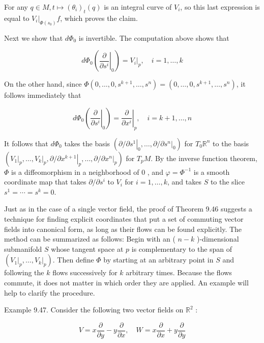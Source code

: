 \documentclass[10pt]{article}
\begin{document}
For any $q \in M, t \mapsto\left(\theta_{i}\right)_{t}(q)$ is an integral curve of $V_{i}$, so this last expression is equal to $\left.V_{i}\right|_{\Phi\left(s_{0}\right)} f$, which proves the claim.

Next we show that $d \Phi_{0}$ is invertible. The computation above shows that

$$
d \Phi_{0}\left(\left.\frac{\partial}{\partial s^{i}}\right|_{0}\right)=\left.V_{i}\right|_{p}, \quad i=1, \ldots, k
$$

On the other hand, since $\Phi\left(0, \ldots, 0, s^{k+1}, \ldots, s^{n}\right)=\left(0, \ldots, 0, s^{k+1}, \ldots, s^{n}\right)$, it follows immediately that

$$
d \Phi_{0}\left(\left.\frac{\partial}{\partial s^{i}}\right|_{0}\right)=\left.\frac{\partial}{\partial x^{i}}\right|_{p}, \quad i=k+1, \ldots, n
$$

It follows that $d \Phi_{0}$ takes the basis $\left(\partial /\left.\partial s^{1}\right|_{0}, \ldots, \partial /\left.\partial s^{n}\right|_{0}\right)$ for $T_{0} \mathbb{R}^{n}$ to the basis $\left(\left.V_{1}\right|_{p}, \ldots,\left.V_{k}\right|_{p}, \partial /\left.\partial x^{k+1}\right|_{p}, \ldots, \partial /\left.\partial x^{n}\right|_{p}\right)$ for $T_{p} M$. By the inverse function theorem, $\Phi$ is a diffeomorphism in a neighborhood of 0 , and $\varphi=\Phi^{-1}$ is a smooth coordinate map that takes $\partial / \partial s^{i}$ to $V_{i}$ for $i=1, \ldots, k$, and takes $S$ to the slice $s^{1}=\cdots=s^{k}=0$.

Just as in the case of a single vector field, the proof of Theorem 9.46 suggests a technique for finding explicit coordinates that put a set of commuting vector fields into canonical form, as long as their flows can be found explicitly. The method can be summarized as follows: Begin with an ( $n-k$ )-dimensional submanifold $S$ whose tangent space at $p$ is complementary to the span of $\left(\left.V_{1}\right|_{p}, \ldots,\left.V_{k}\right|_{p}\right)$. Then define $\Phi$ by starting at an arbitrary point in $S$ and following the $k$ flows successively for $k$ arbitrary times. Because the flows commute, it does not matter in which order they are applied. An example will help to clarify the procedure.

Example 9.47. Consider the following two vector fields on $\mathbb{R}^{2}$ :

$$
V=x \frac{\partial}{\partial y}-y \frac{\partial}{\partial x}, \quad W=x \frac{\partial}{\partial x}+y \frac{\partial}{\partial y}
$$
\end{document}

